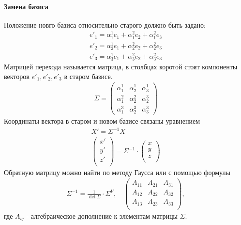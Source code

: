 \documentclass[a4paper]{article}
\numberwithin{equation}{section}
\begin{document}
\paragraph{Замена базиса}
Положение новго базиса относительно старого должно быть задано: 
\begin{gather*}
    e'_1 = \alpha^1_1 e_1 +\alpha^2_1 e_2 + \alpha^2_1 e_3 \\ 
    e'_2 = \alpha^1_2 e_1 +\alpha^2_2 e_2 + \alpha^2_2 e_3 \\ 
    e'_3 = \alpha^1_3 e_1 +\alpha^2_3 e_2 + \alpha^2_3 e_3 
\end{gather*}
Матрицей перехода называется матрица, в столбцах коротой стоят компоненты векторов $e'_1, e'_2,e'_3$ в старом базисе.
\begin{gather*}
    \Sigma = 
    \begin{pmatrix}
        \alpha^1_1 & \alpha^1_2 & \alpha^1_3\\
        \alpha^2_1 & \alpha^2_2 & \alpha^3_2\\
        \alpha^3_1 & \alpha^3_2 & \alpha^3_3
    \end{pmatrix}
\end{gather*}
Координаты вектора в старом и новом базисе связаны уравнением
\begin{gather*}
    X' = \Sigma^{-1} X \\ 
    \begin{pmatrix}
        x'  \\
        y'  \\
        z'  \\
    \end{pmatrix} = \Sigma^{-1} \cdot
    \begin{pmatrix}
        x  \\
        y  \\
        z  \\
    \end{pmatrix}
\end{gather*}
Обратную матрицу можно найти по методу Гаусса или с помощью формулы
\begin{gather*}
    \Sigma^{-1} = \frac{1}{\det \Sigma}\cdot \Sigma^V, \quad 
    \begin{pmatrix}
        A_{11} & A_{21} & A_{31} \\
        A_{12} & A_{22} & A_{32} \\
        A_{13} & A_{23} & A_{33} \\
    \end{pmatrix},
\end{gather*}
где $A_{ij}$ - алгебраическое дополнение к элементам матрицы $\Sigma$.
\end{document}
